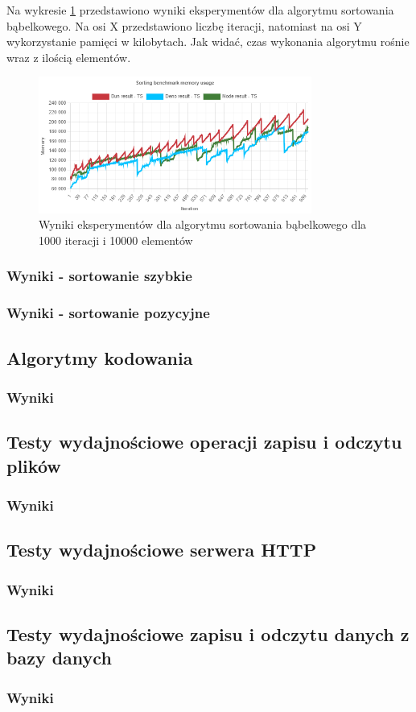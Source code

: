 Na wykresie \ref{fig:bubble_sorting_e6_memory_ts} przedstawiono wyniki eksperymentów dla algorytmu sortowania bąbelkowego. Na osi X przedstawiono liczbę iteracji, natomiast na osi Y wykorzystanie pamięci w kilobytach. Jak widać, czas wykonania algorytmu rośnie wraz z ilością elementów.
\begin{figure}[H]
  \centering
  \includegraphics[width=0.8\textwidth]{Figures/sorting/bubble/e6_memory_ts.png}
  \caption{Wyniki eksperymentów dla algorytmu sortowania bąbelkowego dla 1000 iteracji i 10000 elementów}
  \label{fig:bubble_sorting_e6_memory_ts}
\end{figure}

\subsubsection{Wyniki - sortowanie szybkie}

\subsubsection{Wyniki - sortowanie pozycyjne}

\subsection{Algorytmy kodowania}

\subsubsection{Wyniki}

\subsection{Testy wydajnościowe operacji zapisu i odczytu plików}

\subsubsection{Wyniki}

\subsection{Testy wydajnościowe serwera HTTP}

\subsubsection{Wyniki}

\subsection{Testy wydajnościowe zapisu i odczytu danych z bazy danych}

\subsubsection{Wyniki}